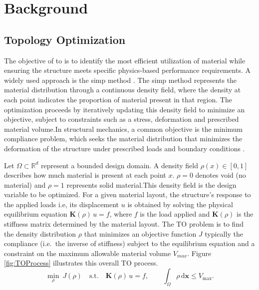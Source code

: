 \documentclass[
  numbers=noenddot,
  english,  %
  a4paper,  %
  twoside,  %
  bibliography=totoc,
  headsepline,
  cleardoublepage=empty,
  parskip=half,
  draft=false
]{scrbook}
\theoremstyle{break}
\begin{document}
\chapter{Background}\label{sec:background}

\section{Topology Optimization}\label{sec:background:topologyoptimization}
The objective of \gls{to} is to identify the most efficient utilization of material while ensuring the structure meets specific physics-based performance requirements. A widely used approach is the \gls{simp} method \cite{c4}. The \gls{simp} method represents the material distribution through a continuous density field, where the density at each point indicates the proportion of material present in that region. The optimization proceeds by iteratively updating this density field to minimize an objective, subject to constraints such as a stress, deformation and prescribed material volume.In structural mechanics, a common objective is the minimum compliance problem, which seeks the material distribution that minimizes the deformation of the structure under prescribed loads and boundary conditions \cite{c5}.

Let $\Omega \subset \mathbb{R}^d$ represent a bounded design domain. A density field $\rho(x) \in [0, 1]$ describes how much material is present at each point $x$. $\rho = 0$ denotes void (no material) and $\rho = 1$ represents solid material.This density field is the design variable to be optimized. For a given material layout, the structure's response to the applied loads i.e, its displacement $u$ is obtained by solving the physical equilibrium equation $\mathbf{K}(\rho)\, u = f$, where $f$ is the load applied and
$\mathbf{K}(\rho)$ is the stiffness matrix determined by the material layout. The
TO problem is to find the density distribution $\rho$ that minimizes an objective function
$J$ typically the compliance (i.e.\ the inverse of stiffness) subject to the
equilibrium equation and a constraint on the maximum allowable material volume $V_{max}$. Figure \ref{fig:TOProcess} illustrates this overall TO process.
%
\begin{equation}
	\min_{\rho} \ J(\rho)
	\quad \text{s.t.} \quad
	\mathbf{K}(\rho)\, u = f,
	\qquad
	\int_{\Omega} \rho \, \mathrm{d}\mathbf{x} \leq V_{\max}.
	\label{eq:TO}
\end{equation}
\end{document}
